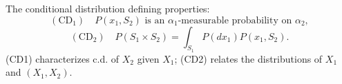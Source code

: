 The conditional distribution defining properties:
$$(\text{CD}_1) \quad P(x_1, S_2) \text{ is an } \alpha_1\text{-measurable probability on } \alpha_2,$$
$$(\text{CD}_2) \quad P(S_1 \times S_2) = \int_{S_1} P(dx_1) P(x_1, S_2).$$
(CD1) characterizes c.d. of $X_2$ given $X_1$; (CD2) relates the distributions of $X_1$ and $(X_1, X_2)$.
